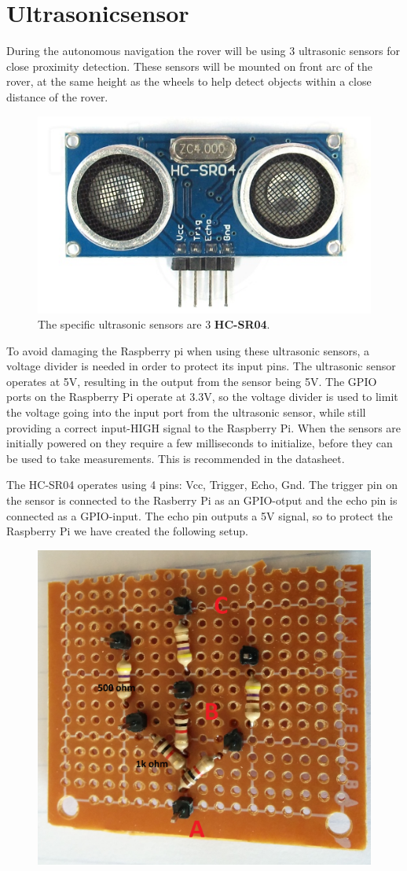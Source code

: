\clearpage
\section{Ultrasonicsensor}

During the autonomous navigation the rover will be using 3 ultrasonic sensors for close proximity detection. These sensors will be mounted on front arc of the rover, at the same height as the wheels to help detect objects within a close distance of the rover.

\begin{figure}[H]
	\centering
	\includegraphics[width=.3\linewidth]{images/hcsr40.jpg}
	\caption{The specific ultrasonic sensors are 3 \textbf{HC-SR04}.}
\end{figure}


To avoid damaging the Raspberry pi when using these ultrasonic sensors, a voltage divider is needed in order to protect its input pins. The ultrasonic sensor operates at 5V, resulting in the output from the sensor being 5V. The GPIO ports on the Raspberry Pi operate at 3.3V, so the voltage divider is used to limit the voltage going into the input port from the ultrasonic sensor, while still providing a correct input-HIGH signal to the Raspberry Pi.
When the sensors are initially powered on they require a few milliseconds to initialize, before they can be used to take measurements. This is recommended in the datasheet.\cite{hcsr40datesheet}

The HC-SR04 operates using 4 pins: Vcc, Trigger, Echo, Gnd.
The trigger pin on the sensor is connected to the Rasberry Pi as an GPIO-otput and the echo pin is connected as a GPIO-input. The echo pin outputs a 5V signal, so to protect the Raspberry Pi we have created the following setup.

\begin{figure}[H]
	\centering
	\includegraphics[width=.3\linewidth]{images/vd_labelled.jpg}
\end{figure}

